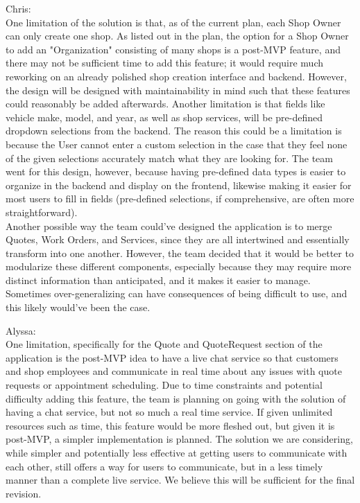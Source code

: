 \documentclass[12pt, titlepage]{article}
\begin{document}
Chris: \\
One limitation of the solution is that, as of the current plan, each Shop Owner can only create one shop. As listed out in the plan, the option for a Shop Owner to add an "Organization" consisting of many shops is a post-MVP feature, and there may not be sufficient time to add this feature; it would require much reworking on an already polished shop creation interface and backend. However, the design will be designed with maintainability in mind such that these features could reasonably be added afterwards. Another limitation is that fields like vehicle make, model, and year, as well as shop services, will be pre-defined dropdown selections from the backend. The reason this could be a limitation is because the User cannot enter a custom selection in the case that they feel none of the given selections accurately match what they are looking for. The team went for this design, however, because having pre-defined data types is easier to organize in the backend and display on the frontend, likewise making it easier for most users to fill in fields (pre-defined selections, if comprehensive, are often more straightforward).  \\

\noindent Another possible way the team could've designed the application is to merge Quotes, Work Orders, and Services, since they are all intertwined and essentially transform into one another. However, the team decided that it would be better to modularize these different components, especially because they may require more distinct information than anticipated, and it makes it easier to manage. Sometimes over-generalizing can have consequences of being difficult to use, and this likely would've been the case.

Alyssa: \\
One limitation, specifically for the Quote and QuoteRequest section of the application is the post-MVP idea to have a live chat service so that customers and shop employees and communicate in real time about any issues with quote requests or appointment scheduling. Due to time constraints and potential difficulty adding this feature, the team is planning on going with the solution of having a chat service, but not so much a real time service. If given unlimited resources such as time, this feature would be more fleshed out, but given it is post-MVP, a simpler implementation is planned. The solution we are considering, while simpler and potentially less effective at getting users to communicate with each other, still offers a way for users to communicate, but in a less timely manner than a complete live service. We believe this will be sufficient for the final revision.
\end{document}
